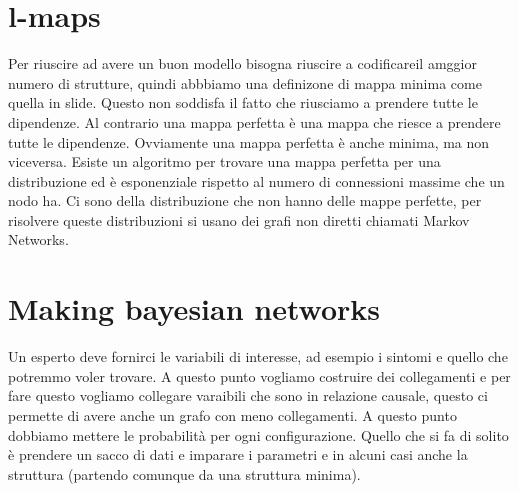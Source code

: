 \section{l-maps}
Per riuscire ad avere un buon modello bisogna riuscire a codificareil amggior numero di strutture, quindi abbbiamo una definizone di mappa minima come quella in slide. Questo non soddisfa il fatto che riusciamo a prendere tutte le dipendenze. \newline
Al contrario una mappa perfetta è una mappa che riesce a prendere tutte le dipendenze. Ovviamente una mappa perfetta è anche minima, ma non viceversa. Esiste un algoritmo per trovare una mappa perfetta per una distribuzione ed è esponenziale rispetto al numero di connessioni massime che un nodo ha. Ci sono della distribuzione che non hanno delle mappe perfette, per risolvere queste distribuzioni si usano dei grafi non diretti chiamati Markov Networks. \newline
\section{Making bayesian networks}
Un esperto deve fornirci le variabili di interesse, ad esempio i sintomi e quello che potremmo voler trovare. A questo punto vogliamo costruire dei collegamenti e per fare questo vogliamo collegare varaibili che sono in relazione causale, questo ci permette di avere anche un grafo con meno collegamenti. A questo punto dobbiamo mettere le probabilità per ogni configurazione. \newline
Quello che si fa di solito è prendere un sacco di dati e imparare i parametri e in alcuni casi anche la struttura (partendo comunque da una struttura minima).
